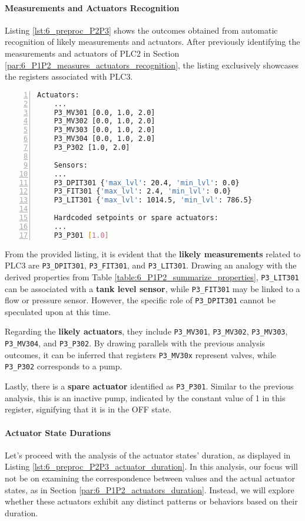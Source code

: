 \paragraph{Measurements and Actuators Recognition}
\label{par:6_P2P3_measures_actuators_recognition}
Listing \ref{lst:6_preproc_P2P3} shows the outcomes obtained from automatic recognition of likely measurements and actuators. After previously identifying the measurements and actuators of PLC2 in Section \ref{par:6_P1P2_measures_actuators_recognition}, the listing exclusively showcases the registers associated with PLC3.

\begin{lstlisting}[language=bash, numbers=left, caption=Preliminary analysis outcomes for sensors and actuators of \texttt{PLC2-3}, label=lst:6_preproc_P2P3]
	Actuators: 
	...
	P3_MV301 [0.0, 1.0, 2.0]
	P3_MV302 [0.0, 1.0, 2.0]
	P3_MV303 [0.0, 1.0, 2.0]
	P3_MV304 [0.0, 1.0, 2.0]
	P3_P302 [1.0, 2.0]
	
	Sensors: 
	...
	P3_DPIT301 {'max_lvl': 20.4, 'min_lvl': 0.0}
	P3_FIT301 {'max_lvl': 2.4, 'min_lvl': 0.0}
	P3_LIT301 {'max_lvl': 1014.5, 'min_lvl': 786.5}
	
	Hardcoded setpoints or spare actuators: 
	...
	P3_P301 [1.0]
\end{lstlisting}

From the provided listing, it is evident that the \textbf{likely measurements} related to PLC3 are \texttt{P3\_DPIT301}, \texttt{P3\_FIT301}, and \texttt{P3\_LIT301}. Drawing an analogy with the derived properties from Table \ref{table:6_P1P2_summarize_properties}, \texttt{P3\_LIT301} can be associated with a \textbf{tank level sensor}, while \texttt{P3\_FIT301} may be linked to a flow or pressure sensor. However, the specific role of \texttt{P3\_DPIT301} cannot be speculated upon at this time.

\bigskip
Regarding the \textbf{likely actuators}, they include \texttt{P3\_MV301}, \texttt{P3\_MV302}, \texttt{P3\_MV303}, \texttt{P3\_MV304}, and \texttt{P3\_P302}. By drawing parallels with the previous analysis outcomes, it can be inferred that registers \texttt{P3\_MV30x} represent valves, while \texttt{P3\_P302} corresponds to a pump.

\bigskip
Lastly, there is a \textbf{spare actuator} identified as \texttt{P3\_P301}. Similar to the previous analysis, this is an inactive pump, indicated by the constant value of 1 in this register, signifying that it is in the OFF state.

\paragraph{Actuator State Durations}
\label{par:6_P2P3_actuators_duration}
Let's proceed with the analysis of the actuator states' duration, as displayed in Listing \ref{lst:6_preproc_P2P3_actuator_duration}. In this analysis, our focus will not be on examining the correspondence between values and the actual actuator states, as in Section \ref{par:6_P1P2_actuators_duration}. Instead, we will explore whether these actuators exhibit any distinct patterns or behaviors based on their duration.

